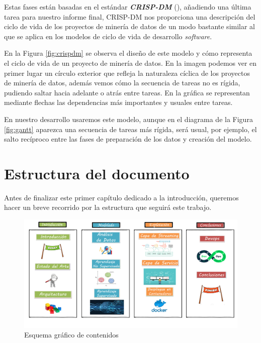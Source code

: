 Estas fases están basadas en el estándar \textbf{\textit{CRISP-DM}} (\cite{crispdm}), añadiendo una última tarea para nuestro informe final, CRISP-DM nos proporciona una descripción del ciclo de vida de los proyectos de minería de datos de un modo bastante similar al que se aplica en los modelos de ciclo de vida de desarrollo \textit{software}.


 

En la Figura \ref{fig:crispdm} se observa el diseño de este modelo y cómo representa el ciclo de vida de un proyecto de minería de datos. En la imagen podemos ver en primer lugar un círculo exterior que refleja la naturaleza cíclica de los proyectos de minería de datos, además vemos cómo la secuencia de tareas no es rígida, pudiendo saltar hacia adelante o atrás entre tareas. En la gráfica se representan mediante flechas las dependencias más importantes y usuales entre tareas.

En nuestro desarrollo usaremos este modelo, aunque en el diagrama de la Figura \ref{fig:gantt} aparezca una secuencia de tareas más rígida, será usual, por ejemplo, el salto recíproco entre las fases de preparación de los datos y creación del modelo.


\section{Estructura del documento}
\label{section:intro:estructura}
Antes de finalizar este primer capítulo dedicado a la introducción, queremos hacer un breve recorrido por la estructura que seguirá este trabajo.



\begin{figure}[!ht]
	\centering
	\includegraphics[width=1\textwidth]{images/intro/indice_v5}
	\caption{Esquema gráfico de contenidos}
	\label{fig:esqu}
\end{figure}

